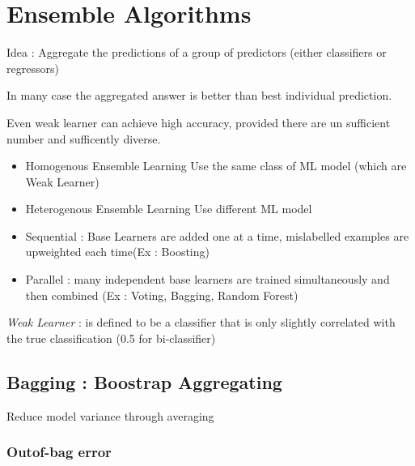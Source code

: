 \chapter{Ensemble Algorithms} %
\label{cha:ensemble_algorithms}


Idea : Aggregate the predictions of a group of predictors (either classifiers or regressors)

In many case the aggregated answer is better than best individual prediction. 

Even weak learner can achieve high accuracy, provided there are un sufficient number and sufficently diverse. 


\begin{definition}
	\begin{itemize}
		\item Homogenous Ensemble Learning
		Use the same class of ML model (which are Weak Learner)
		\item Heterogenous Ensemble Learning
		Use different ML model
		\item  Sequential : Base Learners are added one at a time, mislabelled
examples are upweighted each time(Ex : Boosting)
		\item Parallel : many independent base learners are trained
simultaneously and then combined (Ex : Voting, Bagging, Random Forest)
	\end{itemize}
\end{definition}

\begin{definition}
	\emph{Weak Learner} :  is defined to be a classifier that is only slightly
correlated with the true classification (0.5 for bi-classifier)
\end{definition}


\section{Bagging : Boostrap Aggregating}

	Reduce model variance through averaging

	\subsection{Outof-bag error}


